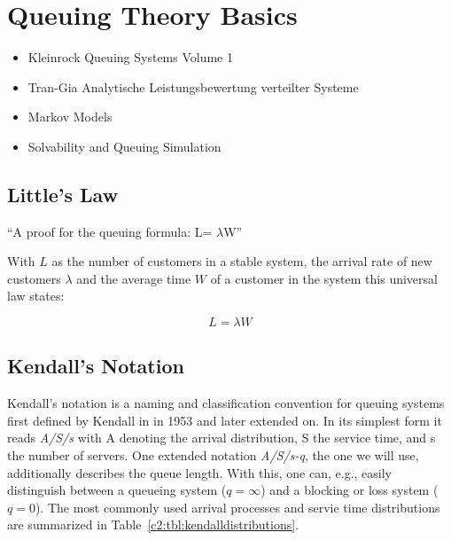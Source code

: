 \section{Queuing Theory Basics}

\begin{itemize}
\item Kleinrock Queuing Systems Volume 1 \cite{Kleinrock:1975:TVQ:1096491}
\item Tran-Gia Analytische Leistungsbewertung verteilter Systeme \cite{trangia-lbvs}
\item Markov Models 
\item Solvability and Queuing Simulation
\end{itemize}


\subsection{Little's Law}
``A proof for the queuing formula: L= $\lambda$W'' \cite{little1961proof}

With $L$  as the number of customers in a stable system, the arrival rate of new customers $\lambda$ and the average time $W$ of a customer in the system this universal law states:

\begin{equation}
L = \lambda W
\end{equation}

\subsection{Kendall's Notation}

Kendall's notation is a naming and classification convention for queuing systems first defined by Kendall in in 1953 \cite{kendall1953stochastic} and later extended on. In its simplest form it reads \textit{A/S/s} with A denoting the arrival distribution, S the service time, and s the number of servers. One extended notation \textit{A/S/s-q}, the one we will use, additionally describes the queue length. With this, one can, e.g., easily distinguish between a queueing system ($q=\infty$) and a blocking or loss system ($q=0$). The most commonly used arrival processes and servie time distributions are summarized in Table~\ref{c2:tbl:kendalldistributions}.


